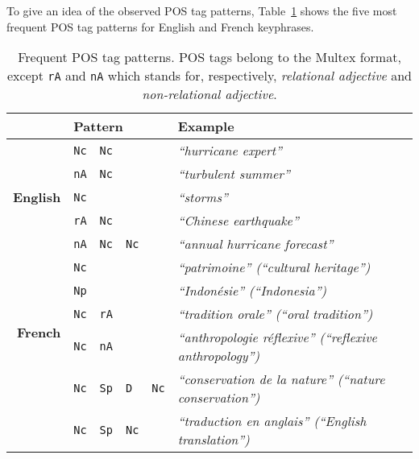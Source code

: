     To give an idea of the observed POS tag patterns,
    Table~\ref{tab:best_patterns} shows the five most frequent POS tag patterns
    for English and French keyphrases.
    \begin{table}[h]
      \centering
      \begin{tabular}{r|lllll}
        \toprule
        \multicolumn{1}{r}{} & \multicolumn{4}{l}{\textbf{Pattern}} & \textbf{Example}\\
        \midrule
        \multirow{5}{*}[-2pt]{\begin{sideways}\textbf{English}\end{sideways}} & \verb:Nc: & \verb:Nc: & & & \textit{``hurricane expert''}\\ %
        & \verb:nA: & \verb:Nc: & & & \textit{``turbulent summer''}\\ %
        & \verb:Nc: & & & & \textit{``storms''}\\ %
        & \verb:rA: & \verb:Nc: & & & \textit{``Chinese earthquake''}\\ %
        & \verb:nA: & \verb:Nc: & \verb:Nc: & & \textit{``annual hurricane forecast''}\\ %
        \hline%
        \multirow{5}{*}[-2pt]{\begin{sideways}\textbf{French}\end{sideways}} & \verb:Nc: & & & & \textit{``patrimoine'' (``cultural heritage'')}\\ %
        & \verb:Np: & & & & \textit{``Indonésie'' (``Indonesia'')}\\ %
        & \verb:Nc: & \verb:rA: & & & \textit{``tradition orale'' (``oral tradition'')}\\ %
        & \verb:Nc: & \verb:nA: & & & \textit{``anthropologie réflexive'' (``reflexive anthropology'')}\\ %
        & \verb:Nc: & \verb:Sp: & \verb:D: & \verb:Nc: & \textit{``conservation de la nature'' (``nature conservation'')}\\ %
        & \verb:Nc: & \verb:Sp: & \verb:Nc: & & \textit{``traduction en anglais'' (``English translation'')}\\ %
        \bottomrule
      \end{tabular}
      \caption{Frequent POS tag patterns. POS tags belong to the Multex format,
               except \texttt{rA} and \texttt{nA} which stands for,
               respectively, \textit{relational adjective} and
               \textit{non-relational adjective}.
               \label{tab:best_patterns}}
    \end{table}

